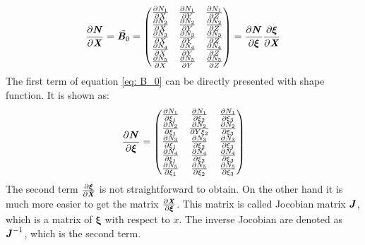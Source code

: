 \begin{equation} \label{eq: B_0}
\frac{\partial \textbf{\textit{N}}}{\partial \textbf{\textit{X}}} = \tilde{\textbf{\textit{B}}_0} = \begin{pmatrix}
\frac{\partial N_1}{\partial X} & \frac{\partial N_1}{\partial Y} & \frac{\partial N_1}{\partial Z} \\
\frac{\partial N_2}{\partial X} & \frac{\partial N_2}{\partial Y} & \frac{\partial N_2}{\partial Z} \\
\frac{\partial N_3}{\partial X} & \frac{\partial N_3}{\partial Y} & \frac{\partial N_3}{\partial Z} \\
\frac{\partial N_4}{\partial X} & \frac{\partial N_4}{\partial Y} & \frac{\partial N_4}{\partial Z} \\
\frac{\partial N_5}{\partial X} & \frac{\partial N_5}{\partial Y} & \frac{\partial N_5}{\partial Z} \\
\end{pmatrix} = \frac{\partial \textbf{\textit{N}}}{\partial \boldsymbol{\xi}} \frac{\partial \boldsymbol{\xi}}{\partial \textbf{\textit{X}}}
\end{equation}
The first term of equation \ref{eq: B_0} can be directly presented with shape function. It is shown as:
\begin{equation}
\frac{\partial \textbf{\textit{N}}}{\partial \boldsymbol{\xi}} = \begin{pmatrix}
\frac{\partial N_1}{\partial \xi_1} & \frac{\partial N_1}{\partial \xi_2} & \frac{\partial N_1}{\partial \xi_3} \\
\frac{\partial N_2}{\partial \xi_1} & \frac{\partial N_2}{\partial Y
	\xi_2} & \frac{\partial N_2}{\partial \xi_3} \\
\frac{\partial N_3}{\partial \xi_1} & \frac{\partial N_3}{\partial \xi_2} & \frac{\partial N_3}{\partial \xi_3} \\
\frac{\partial N_4}{\partial \xi_1} & \frac{\partial N_4}{\partial \xi_2} & \frac{\partial N_4}{\partial \xi_3} \\
\frac{\partial N_5}{\partial \xi_1} & \frac{\partial N_5}{\partial \xi_2} & \frac{\partial N_5}{\partial \xi_3} \\
\end{pmatrix}
\end{equation}
The second term $\frac{\partial \boldsymbol{\xi}}{\partial \textbf{\textit{X}}}$ is not straightforward to obtain. On the other hand it is much more easier to get the matrix $\frac{\partial \textbf{\textit{X}}}{\partial \boldsymbol{\xi}}$. This matrix is called Jocobian matrix $\textbf{\textit{J}}$, which is a matrix of $\boldsymbol{\xi}$ with respect to $x$. The inverse Jocobian are denoted as $\textbf{\textit{J}}^{-1}$, which is the second term. \\
